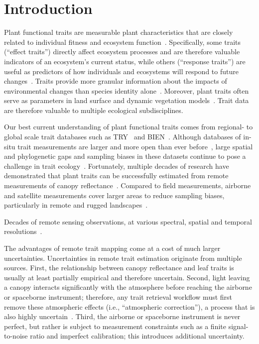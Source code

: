 \documentclass[draft]{agujournal2019}
\begin{document}
\section{Introduction}

Plant functional traits are measurable plant characteristics that are closely related to individual fitness and ecosystem function~\cite{violle2007let}.
Specifically, some traits (``effect traits'') directly affect ecosystem processes and are therefore valuable indicators of an ecosystem's current status, while others (``response traits'') are useful as predictors of how individuals and ecosystems will respond to future changes~\cite{lavorel2002predicting, funk2017revisiting}.
Traits provide more granular information about the impacts of environmental changes than species identity alone~\cite{cadotte2017should}.
Moreover, plant traits often serve as parameters in land surface and dynamic vegetation models~\cite{bonan_2012_reconciling, feng2013scale, harper2016improved, shiklomanov2020structure}.
Trait data are therefore valuable to multiple ecological subdisciplines.

Our best current understanding of plant functional traits comes from regional- to global scale trait databases such as TRY~\cite{kattge2020try} and BIEN~\cite{maitner2018bien}.
Although databases of in-situ trait measurements are larger and more open than ever before~\cite{kattge2020try}, large spatial and phylogenetic gaps and sampling biases in these datasets continue to pose a challenge in trait ecology~\cite{cornwell_2019_what}.
Fortunately, multiple decades of research have demonstrated that plant traits can be successfully estimated from remote measurements of canopy reflectance~\cite{cavender-bares2020remote, verrelst2019quantifying}.
Compared to field measurements, airborne and satellite measurements cover larger areas to reduce sampling biases, particularly in remote and rugged landscapes~\cite{jetz_2016_monitoring, marvin2014amazonian}.

Decades of remote sensing observations, at various spectral, spatial and temporal resolutions~\citep{ustin2021current}.

The advantages of remote trait mapping come at a cost of much larger uncertainties.
Uncertainties in remote trait estimation originate from multiple sources.
First, the relationship between canopy reflectance and leaf traits is usually at least partially empirical and therefore uncertain.
Second, light leaving a canopy interacts significantly with the atmosphere before reaching the airborne or spaceborne instrument;
therefore, any trait retrieval workflow must first remove these atmospheric effects (i.e., ``atmospheric correction''), a process that is also highly uncertain~\cite{thompson2020quantifying}.
Third, the airborne or spaceborne instrument is never perfect, but rather is subject to measurement constraints such as a finite signal-to-noise ratio and imperfect calibration; this introduces additional uncertainty.
\end{document}
